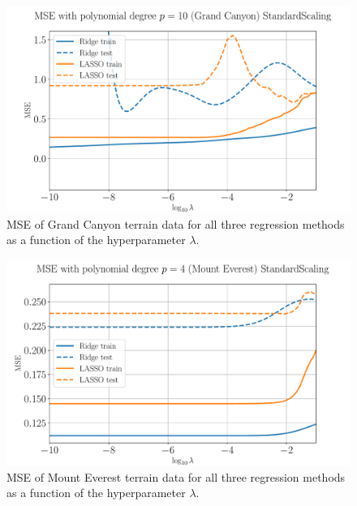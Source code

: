 \documentclass[%
reprint,
amsmath,amssymb,
aps,
pra,
]{revtex4-2}
\begin{document}
\begin{figure}[ht!]
	\centering
	\includegraphics[width=\linewidth]{Python/Figures/Terrain/logMSE_GrandCanStandardScaling_10_zoomed.pdf}
	\caption{MSE of Grand Canyon terrain data for all three regression methods as a function of the hyperparameter $\lambda$.}
	\label{fig:log_GrandCan_StandardScaling_35}
\end{figure}

\begin{figure}[ht!]
	\centering
	\includegraphics[width=\linewidth]{Python/Figures/Terrain/logMSE_MountEver_standardscaling_10_zoomed.pdf}
	\caption{MSE of Mount Everest terrain data for all three regression methods as a function of the hyperparameter $\lambda$.}
	\label{fig:log_MountEve_StandardScaling_35}
\end{figure}
\end{document}
